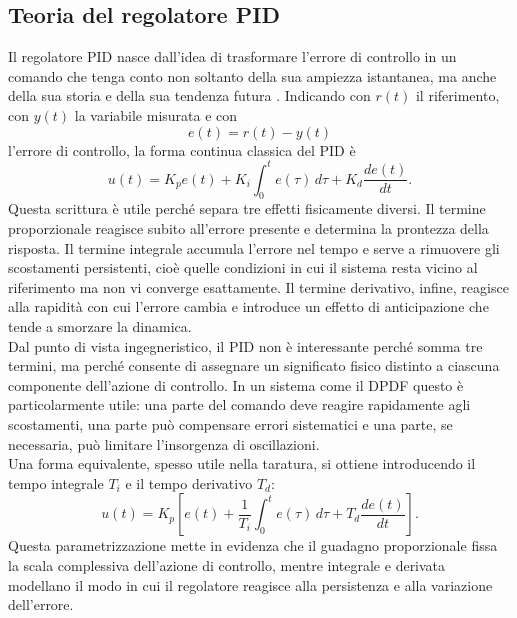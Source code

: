\documentclass[11pt]{report}
\begin{document}
	

	\subsection{Teoria del regolatore PID}
	Il regolatore PID nasce dall'idea di trasformare l'errore di controllo in un comando che tenga conto non soltanto della sua ampiezza istantanea, ma anche della sua storia e della sua tendenza futura \cite{Astrom2002ControlSystemDesign}. Indicando con $r(t)$ il riferimento, con $y(t)$ la variabile misurata e con
	\begin{equation}
		e(t)=r(t)-y(t)
	\end{equation}
	l'errore di controllo, la forma continua classica del PID è
	\begin{equation}
		u(t)=K_p e(t) + K_i \int_0^t e(\tau)\,d\tau + K_d\frac{de(t)}{dt}.
	\end{equation}
	Questa scrittura è utile perché separa tre effetti fisicamente diversi. Il termine proporzionale reagisce subito all'errore presente e determina la prontezza della risposta. Il termine integrale accumula l'errore nel tempo e serve a rimuovere gli scostamenti persistenti, cioè quelle condizioni in cui il sistema resta vicino al riferimento ma non vi converge esattamente. Il termine derivativo, infine, reagisce alla rapidità con cui l'errore cambia e introduce un effetto di anticipazione che tende a smorzare la dinamica.\\
	Dal punto di vista ingegneristico, il PID non è interessante perché somma tre termini, ma perché consente di assegnare un significato fisico distinto a ciascuna componente dell'azione di controllo. In un sistema come il DPDF questo è particolarmente utile: una parte del comando deve reagire rapidamente agli scostamenti, una parte può compensare errori sistematici e una parte, se necessaria, può limitare l'insorgenza di oscillazioni.\\
	Una forma equivalente, spesso utile nella taratura, si ottiene introducendo il tempo integrale $T_i$ e il tempo derivativo $T_d$:
	\begin{equation}
		u(t)=K_p\left[e(t)+\frac{1}{T_i}\int_0^t e(\tau)\,d\tau + T_d\frac{de(t)}{dt}\right].
	\end{equation}
	Questa parametrizzazione mette in evidenza che il guadagno proporzionale fissa la scala complessiva dell'azione di controllo, mentre integrale e derivata modellano il modo in cui il regolatore reagisce alla persistenza e alla variazione dell'errore.
\end{document}
